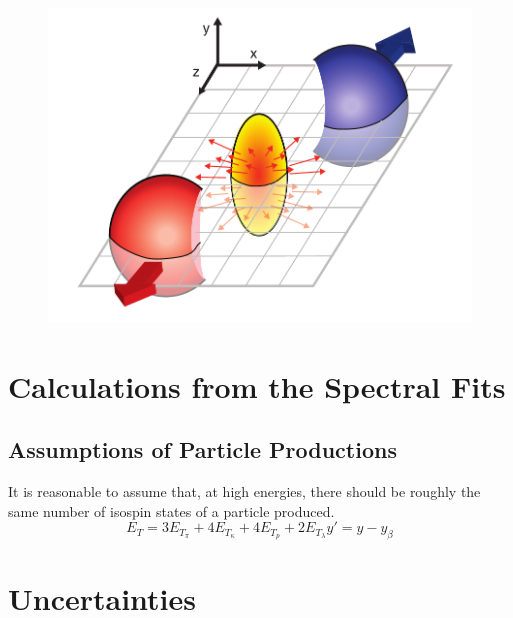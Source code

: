	\begin{figure}[h]
	  \centering
	  \includegraphics[width=4.5in]{figures/flow_elliptic_init_v4.pdf}
	  \caption{ \cite{}}\label{fig:}
	\end{figure}

\section{Calculations from the Spectral Fits}
\subsection{Assumptions of Particle Productions}
It is reasonable to assume that, at high energies, there should be roughly the same number of isospin states of a particle produced. 
	\begin{equation}\label{eqn:rapidityTransformation}
	E_{T} = 3E_{T}_\pi + 4E_{T}_\kappa + 4E_{T}_p + 2E_{T}_\lambda
	y' = y - y_{\beta}
	\end{equation}
 
\subsection{}
\subsection{}
\section{Uncertainties}
